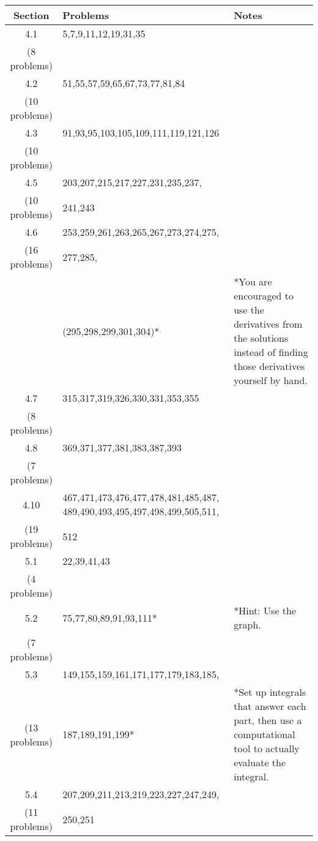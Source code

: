 \documentclass[11pt,fleqn]{article}
\begin{document}
\begin{tabularx}{\textwidth}{|c|| X | X | }
\hline
Section&Problems& Notes \\
\hline \hline
4.1&5,7,9,11,12,19,31,35& \\
(8 problems)&& \\ \hline

4.2&51,55,57,59,65,67,73,77,81,84& \\
(10 problems)&& \\ \hline

4.3&91,93,95,103,105,109,111,119,121,126& \\
(10 problems)&& \\ \hline

4.5&203,207,215,217,227,231,235,237,& \\
(10 problems)&241,243& \\ \hline

4.6&253,259,261,263,265,267,273,274,275,& \\
(16 problems) &277,285,& \\
&(295,298,299,301,304)*&*You are encouraged to use the derivatives from the solutions instead of finding those derivatives yourself by hand.\\ \hline

4.7&315,317,319,326,330,331,353,355& \\
(8 problems)&& \\ \hline

4.8&369,371,377,381,383,387,393& \\
(7 problems) && \\ \hline

4.10&467,471,473,476,477,478,481,485,487, 489,490,493,495,497,498,499,505,511,& \\
(19 problems)&512& \\ \hline \hline

5.1&22,39,41,43& \\ 
(4 problems)&& \\ \hline

5.2&75,77,80,89,91,93,111*&*Hint: Use the graph. \\ 
(7 problems)&& \\ \hline

5.3&149,155,159,161,171,177,179,183,185,& \\ 
(13 problems)&187,189,191,199*&*Set up integrals that answer each part, then use a computational tool to actually evaluate the integral.\\ \hline

5.4&207,209,211,213,219,223,227,247,249,& \\ 
(11 problems)&250,251& \\ \hline


\end{tabularx}
\end{document}
